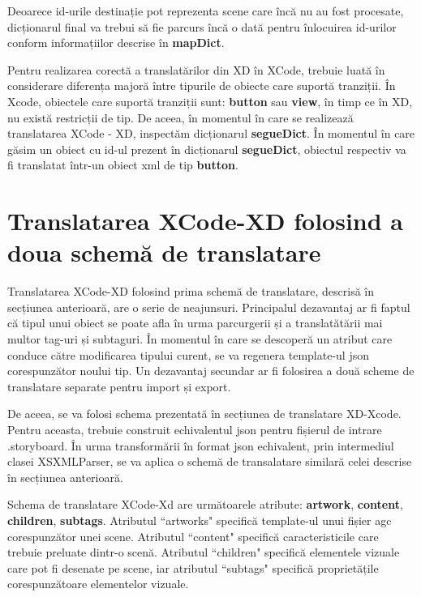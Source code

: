 Deoarece id-urile destinație pot reprezenta scene care încă nu au fost procesate, dicționarul final va trebui să fie parcurs încă o dată pentru înlocuirea id-urilor conform informațiilor descrise în \textbf{mapDict}.

Pentru realizarea corectă a translatărilor din XD în XCode, trebuie luată în considerare diferența majoră între tipurile de obiecte care suportă tranziții. În Xcode, obiectele care suportă tranziții sunt: \textbf{button} sau \textbf{view}, în timp ce în XD, nu există restricții de tip. De aceea, în momentul în care se realizează translatarea XCode - XD, inspectăm dicționarul \textbf{segueDict}. În momentul în care găsim un obiect cu id-ul prezent în dicționarul  \textbf{segueDict}, obiectul respectiv va fi translatat într-un obiect xml de tip \textbf{button}.

\section {Translatarea XCode-XD folosind a doua schemă de translatare} \label{xcxd2schema}

Translatarea XCode-XD folosind prima schemă de translatare, descrisă în secțiunea anterioară, are o serie de neajunsuri. Principalul dezavantaj ar fi faptul că tipul unui obiect se poate afla în urma parcurgerii și a translatătării mai multor tag-uri și subtaguri. În momentul în care se descoperă un atribut care conduce către modificarea tipului curent, se va regenera template-ul json corespunzător noului tip.  
Un dezavantaj secundar ar fi folosirea a două scheme de translatare separate pentru import și export.

De aceea, se va folosi schema prezentată în secțiunea de translatare XD-Xcode. Pentru aceasta, trebuie construit echivalentul json pentru fișierul de intrare .storyboard. În urma transformării în format json echivalent, prin intermediul clasei XSXMLParser, se va aplica o schemă de transalatare similară celei descrise în secțiunea anterioară.

Schema de translatare XCode-Xd are următoarele atribute: \textbf{artwork}, \textbf{content}, \textbf{children}, \textbf{subtags}. Atributul ``artworks" specifică template-ul unui fișier agc corespunzător unei scene. Atributul ``content" specifică caracteristicile care trebuie preluate dintr-o scenă. Atributul ``children" specifică elementele vizuale care pot fi desenate pe scene, iar atributul ``subtags" specifică proprietățile corespunzătoare elementelor vizuale.

